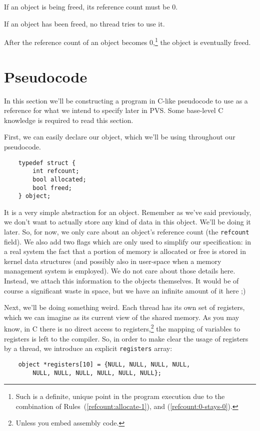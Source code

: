 \begin{myrule}\label{refcount:free-implies-0}
	If an object is being freed, its reference count must be 0.
\end{myrule}

\begin{myrule}\label{refcount:use-after-free}
	If an object has been freed, no thread tries to use it.
\end{myrule}

\begin{myrule}\label{refcount:eventual-free}
	After the reference count of an object becomes 0,\footnote{%
		Such is a definite, unique point in the program execution due to the combination of Rules~(\ref{refcount:allocate-1}), and (\ref{refcount:0-stays-0}).
	} the object is eventually freed.
\end{myrule}

\section{Pseudocode}\label{sec:pseudocode}

In this section we'll be constructing a program in C-like pseudocode to use as a reference for what we intend to specify later in PVS\@.
Some base-level C knowledge is required to read this section.

First, we can easily declare our object, which we'll be using throughout our pseudocode.

\begin{verbatim}
	typedef struct {
	    int refcount;
	    bool allocated;
	    bool freed;
	} object;
\end{verbatim}

It is a very simple abstraction for an object.
Remember as we've said previously, we don't want to actually store any kind of data in this object.
We'll be doing it later.
So, for now, we only care about an object's reference count (the \texttt{refcount} field).
We also add two flags which are only used to simplify our specification: in a real system the fact that a portion of memory is allocated or free is stored in kernel data structures (and possibly also in user-space when a memory management system is employed).
We do not care about those details here.
Instead, we attach this information to the objects themselves.
It would be of course a significant waste in space, but we have an infinite amount of it here ;)

Next, we'll be doing something weird.
Each thread has its own set of registers, which we can imagine as its current view of the shared memory.
As you may know, in C there is no direct access to registers,\footnote{%
	Unless you embed assembly code.
} the mapping of variables to registers is left to the compiler.
So, in order to make clear the usage of registers by a thread, we introduce an explicit \texttt{registers} array:
\begin{verbatim}
	object *registers[10] = {NULL, NULL, NULL, NULL,
	    NULL, NULL, NULL, NULL, NULL, NULL};
\end{verbatim}

